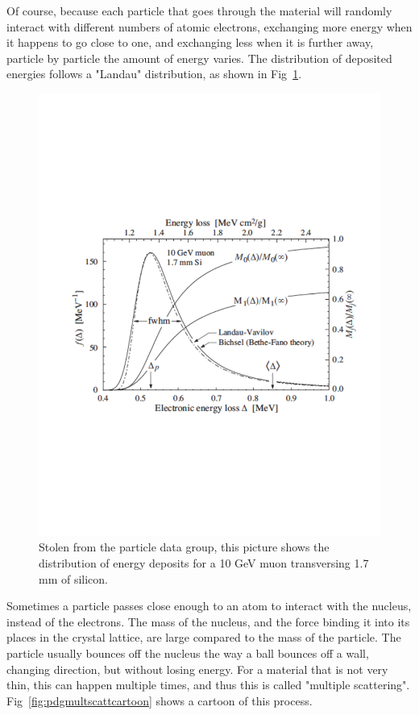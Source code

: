 Of course, because each particle that goes through the material will randomly interact with different numbers of atomic electrons, exchanging more energy when it happens to go close to one, and exchanging less when it is further away, particle by particle the amount of energy varies.  The distribution of deposited energies follows a "Landau" distribution, as shown in Fig~\ref{fig:landau}.


\begin{figure}[h]
\centering\includegraphics[scale=0.5]{./particleinteractions/Pictures/landau.pdf}
\caption{Stolen from the particle data group, this picture shows the distribution of energy deposits for a 10 GeV muon transversing 1.7 mm of silicon. }
\label{fig:landau}
\end{figure}

Sometimes a particle passes close enough to an atom to interact with the nucleus, instead of the electrons.  The mass of the nucleus, and the force binding it into its places in the crystal lattice, are large compared to the mass of the particle.  The particle usually bounces off the nucleus the way a ball bounces off a wall, changing direction, but without losing energy.  For a material that is not very thin, this can happen multiple times, and thus this is called "multiple scattering".  Fig~\ref{fig:pdgmultscattcartoon} shows a cartoon of this process.


